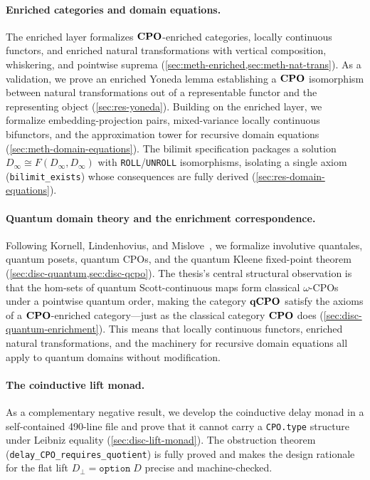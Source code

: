 \paragraph{Enriched categories and domain equations.}
The enriched layer formalizes $\mathbf{CPO}$-enriched categories, locally
continuous functors, and enriched natural transformations with
vertical composition, whiskering, and pointwise suprema
(\cref{sec:meth-enriched,sec:meth-nat-trans}).
As a validation, we prove an enriched Yoneda lemma establishing a
$\mathbf{CPO}$ isomorphism between natural transformations out of a
representable functor and the representing object
(\cref{sec:res-yoneda}).
Building on the enriched layer, we formalize embedding-projection
pairs, mixed-variance locally continuous bifunctors, and the
approximation tower for recursive domain equations
(\cref{sec:meth-domain-equations}).
The bilimit specification packages a solution
$D_\infty \cong F(D_\infty, D_\infty)$ with \texttt{ROLL}/\texttt{UNROLL}
isomorphisms, isolating a single axiom (\texttt{bilimit\_exists})
whose consequences are fully derived
(\cref{sec:res-domain-equations}).

\paragraph{Quantum domain theory and the enrichment correspondence.}
Following Kornell, Lindenhovius, and Mislove~\cite{KLM2024}, we
formalize involutive quantales, quantum posets, quantum CPOs, and the
quantum Kleene fixed-point theorem
(\cref{sec:disc-quantum,sec:disc-qcpo}).
The thesis's central structural observation is that the hom-sets of
quantum Scott-continuous maps form classical $\omega$-CPOs under a
pointwise quantum order, making the category $\mathbf{qCPO}$
satisfy the axioms of a $\mathbf{CPO}$-enriched category---just as the
classical category $\mathbf{CPO}$ does
(\cref{sec:disc-quantum-enrichment}).
This means that locally continuous functors, enriched natural
transformations, and the machinery for recursive domain equations all
apply to quantum domains without modification.

\paragraph{The coinductive lift monad.}
As a complementary negative result, we develop the coinductive delay
monad in a self-contained 490-line file and prove that it cannot
carry a \texttt{CPO.type} structure under Leibniz equality
(\cref{sec:disc-lift-monad}).
The obstruction theorem (\texttt{delay\_CPO\_requires\_quotient}) is
fully proved and makes the design rationale for the flat lift
$D_\bot = \texttt{option}\;D$ precise and machine-checked.


